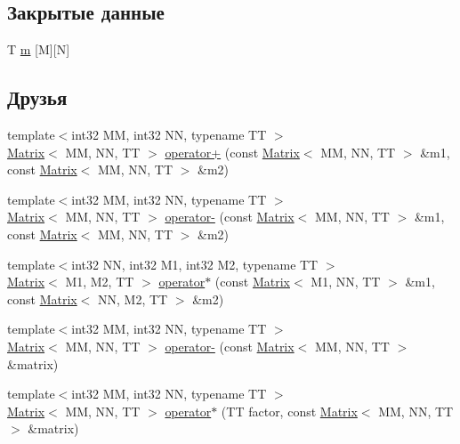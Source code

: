 \subsection*{Закрытые данные}
\begin{DoxyCompactItemize}
\item 
T \hyperlink{class_matrix_a9cd751074f76f6d7019834492e30bb5c}{m} \mbox{[}M\mbox{]}\mbox{[}N\mbox{]}
\end{DoxyCompactItemize}
\subsection*{Друзья}
\begin{DoxyCompactItemize}
\item 
{\footnotesize template$<$int32 MM, int32 NN, typename TT $>$ }\\\hyperlink{class_matrix}{Matrix}$<$ MM, NN, TT $>$ \hyperlink{class_matrix_ade356cdf3e34c2ed51bd20166cd91d58}{operator+} (const \hyperlink{class_matrix}{Matrix}$<$ MM, NN, TT $>$ \&m1, const \hyperlink{class_matrix}{Matrix}$<$ MM, NN, TT $>$ \&m2)
\item 
{\footnotesize template$<$int32 MM, int32 NN, typename TT $>$ }\\\hyperlink{class_matrix}{Matrix}$<$ MM, NN, TT $>$ \hyperlink{class_matrix_a012fd845172a7a29f1ace01dd0191962}{operator-\/} (const \hyperlink{class_matrix}{Matrix}$<$ MM, NN, TT $>$ \&m1, const \hyperlink{class_matrix}{Matrix}$<$ MM, NN, TT $>$ \&m2)
\item 
{\footnotesize template$<$int32 NN, int32 M1, int32 M2, typename TT $>$ }\\\hyperlink{class_matrix}{Matrix}$<$ M1, M2, TT $>$ \hyperlink{class_matrix_aac9476d517d9f0c8224e1d17ce52e04d}{operator$\ast$} (const \hyperlink{class_matrix}{Matrix}$<$ M1, NN, TT $>$ \&m1, const \hyperlink{class_matrix}{Matrix}$<$ NN, M2, TT $>$ \&m2)
\item 
{\footnotesize template$<$int32 MM, int32 NN, typename TT $>$ }\\\hyperlink{class_matrix}{Matrix}$<$ MM, NN, TT $>$ \hyperlink{class_matrix_afacec860ab5322f435b2d1cd4331f477}{operator-\/} (const \hyperlink{class_matrix}{Matrix}$<$ MM, NN, TT $>$ \&matrix)
\item 
{\footnotesize template$<$int32 MM, int32 NN, typename TT $>$ }\\\hyperlink{class_matrix}{Matrix}$<$ MM, NN, TT $>$ \hyperlink{class_matrix_a47bf9d770ba7d5830a285da8ce5740e9}{operator$\ast$} (TT factor, const \hyperlink{class_matrix}{Matrix}$<$ MM, NN, TT $>$ \&matrix)

\end{DoxyCompactItemize}
